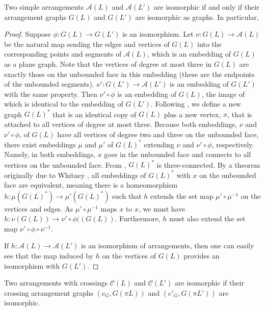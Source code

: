 \documentclass[11pt, oneside]{article}
\begin{document}
\begin{lem}
Two simple arrangements $\mathcal{A}(L)$ and $\mathcal{A}(L')$ are isomorphic if and only if their arrangement graphs $G(L)$ and $G(L')$ are isomorphic as graphs. In particular, 
\end{lem}

\begin{proof}
Suppose $\phi: G(L) \to G(L')$ is an isomorphism. Let $\nu:G(L) \to \mathcal{A}(L)$ be the natural map sending the edges and vertices of $G(L)$ into the corresponding points and segments of $\mathcal{A}(L)$, which is an embedding of $G(L)$ as a plane graph. 
Note that the vertices of degree at most three in $G(L)$ are exactly those on the unbounded face in this embedding (these are the endpoints of the unbounded segments).  $\nu': G(L') \to \mathcal{A}(L')$ is an embedding of $G(L')$ with the same property. 
Then $\nu' \circ \phi$ is an embedding of $G(L)$, the image of which is identical to the embedding of $G(L')$. Following \cite{bose}, we define a new graph $G(L)^*$ that is an identical copy of $G(L)$ plus a new vertex, $x$, that is attached to all vertices of degree at most three. 
Because both embeddings, $\nu$ and $\nu'\circ\phi$, of $G(L)$ have all vertices of degree two and three on the unbounded face, there exist embeddings $\mu$ and $\mu'$ of $G(L)^*$ extending $\nu$ and $\nu' \circ \phi$, respectively. 
Namely, in both embeddings, $x$ goes in the unbounded face and connects to all vertices on the unbounded face. From \cite{bose}, $G(L)^*$ is three-connected. 
By a theorem originally due to Whitney \cite{diestel}, all embeddings of $G(L)^*$ with $x$ on the unbounded face are equivalent, meaning there is a homeomorphism $h:\mu(G(L)^*) \to \mu'(G(L)^*)$ such that $h$ extends the set map $\mu' \circ \mu^{-1}$ on the vertices and edges. As $\mu' \circ \mu^{-1}$ maps $x$ to $x$, we must have $h: \nu(G(L)) \to \nu' \circ \phi((G(L))$. 
Furthermore, $h$ must also extend the set map $\nu' \circ \phi \circ \nu^{-1}$.

If $h:\mathcal{A}(L) \to \mathcal{A}(L')$ is an isomorphism of arrangements, then one can easily see that the map induced by $h$ on the vertices of $G(L)$ provides an isomorphism with $G(L')$. \end{proof}
 
 \begin{lem}\label{cgraphtoarr}
Two arrangements with crossings $\mathcal{C}(L)$ and $\mathcal{C}(L')$ are isomorphic if their crossing arrangement graphs $(c_G, G(\pi L))$ and $(c'_G, G(\pi L'))$ are isomorphic.
\end{lem}
\end{document}
